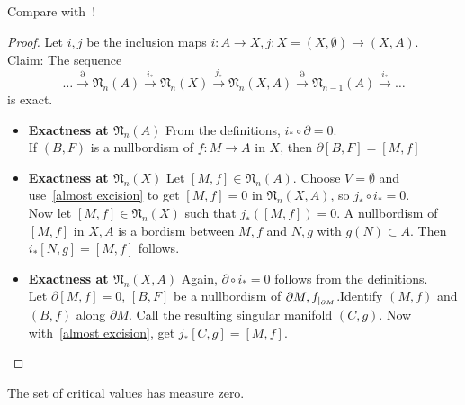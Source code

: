 \documentclass[a4paper,11pt]{article}
\begin{document}
Compare with\ \cite{zhang}!

\begin{proof}\cite{dieck}
    Let \(i,j\) be the inclusion maps \(i:A\to X, j:X=(X,\emptyset)\to(X,A)\).\\
    Claim: The sequence
    \[\dots\xrightarrow{\partial}\mathfrak{N}_n(A)\xrightarrow{i_\ast}\mathfrak{N}_n(X)\xrightarrow{j_\ast}\mathfrak{N}_n(X,A)\xrightarrow{\partial}\mathfrak{N}_{n-1}(A)\xrightarrow{i_\ast}\dots\]
    is exact.
    \begin{itemize}
        \item \textbf{Exactness at \(\mathfrak{N}_n(A)\)} From the definitions, \(i_\ast\circ \partial=0\).\\
        If \((B,F)\) is a nullbordism of \(f:M\to A\) in \(X\), then \(\partial[B,F]=[M,f]\)
        \item \textbf{Exactness at \(\mathfrak{N}_n(X)\)} Let \([M,f]\in\mathfrak{N}_n(A)\). Choose \(V=\emptyset\) and use\ \ref{almost excision} to get \([M,f]=0\) in \(\mathfrak{N}_n(X,A)\), so \(j_\ast\circ i_\ast=0\).\\
        Now let \([M,f]\in\mathfrak{N}_n(X)\) such that \(j_\ast([M,f])=0\). A nullbordism of \([M,f]\) in \(X,A\) is a bordism between \(M,f\) and \(N,g\) with \(g(N)\subset A\). Then \(i_\ast[N,g]=[M,f]\) follows.
        \item \textbf{Exactness at \(\mathfrak{N}_n(X,A)\)} Again, \(\partial \circ i_\ast=0\) follows from the definitions.\\
        Let \(\partial[M,f]=0\), \([B,F]\) be a nullbordism of \(\partial M, f_{|_{\partial M}}\).Identify \((M,f)\) and \((B,f)\) along \(\partial M\). Call the resulting singular manifold \((C,g)\). Now with\ \ref{almost excision}, get \(j_\ast[C,g]=[M,f]\).
    \end{itemize}
\end{proof}

\begin{theorem}\label{sard}
    The set of critical values has measure zero.
\end{theorem}
\end{document}
